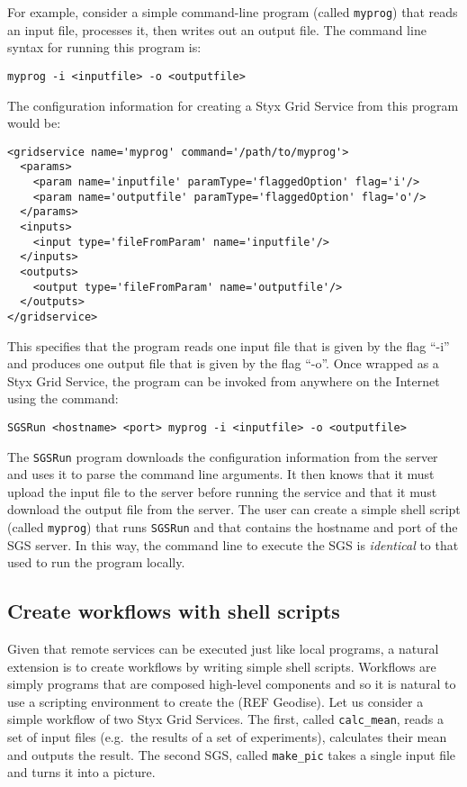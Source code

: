 \documentclass{llncs}
\begin{document}
For example, consider a simple command-line program (called {\tt myprog}) that reads an input file, processes it, then writes out an output file.  The command line syntax for running this program is:

\begin{verbatim}
myprog -i <inputfile> -o <outputfile>
\end{verbatim}

The configuration information for creating a Styx Grid Service from this program would be:

\begin{verbatim}
<gridservice name='myprog' command='/path/to/myprog'>
  <params>
    <param name='inputfile' paramType='flaggedOption' flag='i'/>
    <param name='outputfile' paramType='flaggedOption' flag='o'/>
  </params>
  <inputs>
    <input type='fileFromParam' name='inputfile'/>
  </inputs>
  <outputs>
    <output type='fileFromParam' name='outputfile'/>
  </outputs>
</gridservice>
\end{verbatim}

This specifies that the program reads one input file that is given by the flag ``-i'' and produces one output file that is given by the flag ``-o''.  Once wrapped as a Styx Grid Service, the program can be invoked from anywhere on the Internet using the command:

\begin{verbatim}
SGSRun <hostname> <port> myprog -i <inputfile> -o <outputfile>
\end{verbatim}

The {\tt SGSRun} program downloads the configuration information from the server and uses it to parse the command line arguments.  It then knows that it must upload the input file to the server before running the service and that it must download the output file from the server.  The user can create a simple shell script (called {\tt myprog}) that runs {\tt SGSRun} and that contains the hostname and port of the SGS server.  In this way, the command line to execute the SGS is {\em identical\/} to that used to run the program locally.

\subsection{Create workflows with shell scripts}
Given that remote services can be executed just like local programs, a natural extension is to create workflows by writing simple shell scripts.  Workflows are simply programs that are composed high-level components and so it is natural to use a scripting environment to create the (REF Geodise).  Let us consider a simple workflow of two Styx Grid Services.  The first, called {\tt calc\_mean}, reads a set of input files (e.g.\ the results of a set of experiments), calculates their mean and outputs the result.  The second SGS, called {\tt make\_pic} takes a single input file and turns it into a picture.
\end{document}
